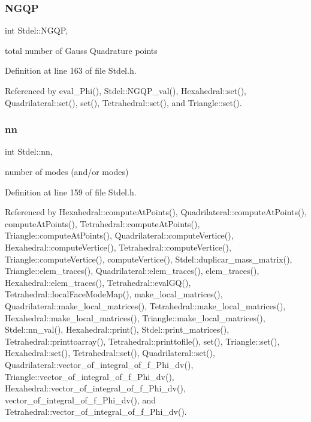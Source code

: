 \subsubsection{\texorpdfstring{N\+G\+QP}{NGQP}}
{\footnotesize\ttfamily int Stdel\+::\+N\+G\+QP\hspace{0.3cm}{\ttfamily [protected]}, {\ttfamily [inherited]}}



total number of Gauss Quadrature points 



Definition at line 163 of file Stdel.\+h.



Referenced by eval\+\_\+\+Phi(), Stdel\+::\+N\+G\+Q\+P\+\_\+val(), Hexahedral\+::set(), Quadrilateral\+::set(), set(), Tetrahedral\+::set(), and Triangle\+::set().

\mbox{\label{classStdel_af4d02765d362e2f0469633ff78734f89}} 
\subsubsection{\texorpdfstring{nn}{nn}}
{\footnotesize\ttfamily int Stdel\+::nn\hspace{0.3cm}{\ttfamily [protected]}, {\ttfamily [inherited]}}



number of modes (and/or modes) 



Definition at line 159 of file Stdel.\+h.



Referenced by Hexahedral\+::compute\+At\+Points(), Quadrilateral\+::compute\+At\+Points(), compute\+At\+Points(), Tetrahedral\+::compute\+At\+Points(), Triangle\+::compute\+At\+Points(), Quadrilateral\+::compute\+Vertice(), Hexahedral\+::compute\+Vertice(), Tetrahedral\+::compute\+Vertice(), Triangle\+::compute\+Vertice(), compute\+Vertice(), Stdel\+::duplicar\+\_\+mass\+\_\+matrix(), Triangle\+::elem\+\_\+traces(), Quadrilateral\+::elem\+\_\+traces(), elem\+\_\+traces(), Hexahedral\+::elem\+\_\+traces(), Tetrahedral\+::eval\+G\+Q(), Tetrahedral\+::local\+Face\+Mode\+Map(), make\+\_\+local\+\_\+matrices(), Quadrilateral\+::make\+\_\+local\+\_\+matrices(), Tetrahedral\+::make\+\_\+local\+\_\+matrices(), Hexahedral\+::make\+\_\+local\+\_\+matrices(), Triangle\+::make\+\_\+local\+\_\+matrices(), Stdel\+::nn\+\_\+val(), Hexahedral\+::print(), Stdel\+::print\+\_\+matrices(), Tetrahedral\+::printtoarray(), Tetrahedral\+::printtofile(), set(), Triangle\+::set(), Hexahedral\+::set(), Tetrahedral\+::set(), Quadrilateral\+::set(), Quadrilateral\+::vector\+\_\+of\+\_\+integral\+\_\+of\+\_\+f\+\_\+\+Phi\+\_\+dv(), Triangle\+::vector\+\_\+of\+\_\+integral\+\_\+of\+\_\+f\+\_\+\+Phi\+\_\+dv(), Hexahedral\+::vector\+\_\+of\+\_\+integral\+\_\+of\+\_\+f\+\_\+\+Phi\+\_\+dv(), vector\+\_\+of\+\_\+integral\+\_\+of\+\_\+f\+\_\+\+Phi\+\_\+dv(), and Tetrahedral\+::vector\+\_\+of\+\_\+integral\+\_\+of\+\_\+f\+\_\+\+Phi\+\_\+dv().

